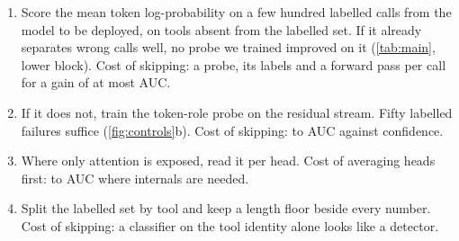 \begin{tcolorbox}[colback=white,colframe=black!60,boxrule=0.5pt,arc=1pt,left=4pt,right=4pt,top=3pt,bottom=3pt,title=\small Before building an internal judge for a tool-calling model]
\small
\begin{enumerate}[topsep=0pt,itemsep=1pt,leftmargin=1.2em]
\item Score the mean token log-probability on a few hundred labelled calls from the model to be deployed, on tools absent from the labelled set. If it already separates wrong calls well, no probe we trained improved on it (\cref{tab:main}, lower block). Cost of skipping: a probe, its labels and a forward pass per call for a gain of at most \gapConfidenceMax{} AUC.
\item If it does not, train the token-role probe on the residual stream. Fifty labelled failures suffice (\cref{fig:controls}b). Cost of skipping: \gapInternalsMin{} to \gapInternalsMax{} AUC against confidence.
\item Where only attention is exposed, read it per head. Cost of averaging heads first: \phHavgMinInternals{} to \phHavgMaxInternals{} AUC where internals are needed.
\item Split the labelled set by tool and keep a length floor beside every number. Cost of skipping: a classifier on the tool identity alone looks like a detector.
\end{enumerate}
\end{tcolorbox}
